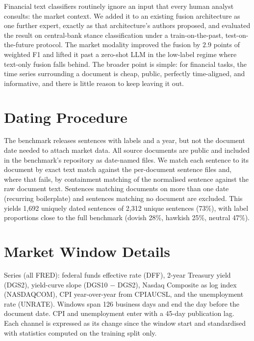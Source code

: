 \documentclass[11pt]{article}
\begin{document}
Financial text classifiers routinely ignore an input that every human analyst consults: the market context. We added it to an existing fusion architecture as one further expert, exactly as that architecture's authors proposed, and evaluated the result on central-bank stance classification under a train-on-the-past, test-on-the-future protocol. The market modality improved the fusion by $2.9$ points of weighted F1 and lifted it past a zero-shot LLM in the low-label regime where text-only fusion falls behind. The broader point is simple: for financial tasks, the time series surrounding a document is cheap, public, perfectly time-aligned, and informative, and there is little reason to keep leaving it out.




\appendix

\section{Dating Procedure}
\label{app:dating}

The benchmark releases sentences with labels and a year, but not the document date needed to attach market data. All source documents are public and included in the benchmark's repository as date-named files. We match each sentence to its document by exact text match against the per-document sentence files and, where that fails, by containment matching of the normalised sentence against the raw document text. Sentences matching documents on more than one date (recurring boilerplate) and sentences matching no document are excluded. This yields 1{,}692 uniquely dated sentences of 2{,}312 unique sentences (73\%), with label proportions close to the full benchmark (dovish 28\%, hawkish 25\%, neutral 47\%).

\section{Market Window Details}
\label{app:window}

Series (all FRED): federal funds effective rate (DFF), 2-year Treasury yield (DGS2), yield-curve slope (DGS10 $-$ DGS2), Nasdaq Composite as log index (NASDAQCOM), CPI year-over-year from CPIAUCSL, and the unemployment rate (UNRATE). Windows span 126 business days and end the day before the document date. CPI and unemployment enter with a 45-day publication lag. Each channel is expressed as its change since the window start and standardised with statistics computed on the training split only.
\end{document}
